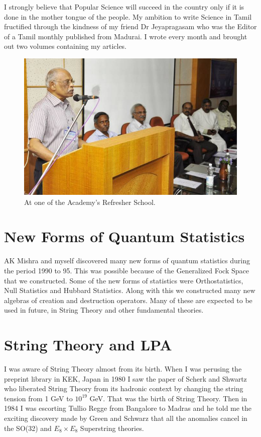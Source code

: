 I strongly believe that Popular Science will succeed in the country
only if it is done 
in the mother tongue of the people. My ambition to write Science in Tamil 
fructified through the kindness of my friend Dr Jeyapragasam who was the 
Editor of a Tamil monthly published from Madurai. I wrote every month 
and brought out two volumes containing my articles.
\begin{figure}[h]
\centering
\includegraphics[width=\textwidth]{images/Rajaji-outreach-1.jpg}
\caption{At one of the Academy's Refresher School.}
\end{figure}
     
\section*{New Forms of Quantum Statistics}

AK Mishra and myself discovered many new forms of quantum statistics during
the period 1990 to 95. This was possible because of the Generalized Fock Space
that we constructed. Some of the new forms of statistics were Orthostatistics,
Null Statistics and Hubbard Statistics. Along with this we constructed many
new algebras of creation and destruction operators. Many of these are expected
to be used in future, in String Theory and other fundamental theories.

\section*{String Theory and LPA}

I was aware of String Theory almost from its birth. When I was perusing 
the preprint library in KEK, Japan in 1980 I saw the paper of Scherk and 
Shwartz who liberated String Theory from its hadronic context by 
changing the string tension from 1 GeV to $10^{19}$ GeV. That was the birth 
of String Theory. Then in 1984 I was escorting Tullio Regge from 
Bangalore to Madras and he told me the exciting discovery made by Green 
and Schwarz that all the anomalies cancel in the SO(32) and $E_8 \times E_8$ 
Superstring theories.

